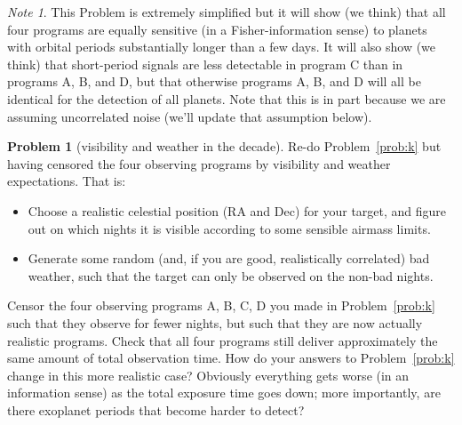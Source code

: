 \documentclass{article}
\theoremstyle{definition}
\newcommand{\problemname}{Problem}
\newtheorem{problem}{\problemname}
\newcommand{\probref}[1]{\problemname~\ref{#1}}
\theoremstyle{remark}
\newcommand{\notename}{Note}
\newtheorem{note}{\notename}[problem]
\begin{document}
\begin{note}
This \problemname{} is extremely simplified but it will show (we think) that all four programs are equally sensitive (in a Fisher-information sense) to planets with orbital periods substantially longer than a few days.
It will also show (we think) that short-period signals are less detectable in program C than in programs A, B, and D,
but that otherwise programs A, B, and D will all be identical for the detection of all planets.
Note that this is in part because we are assuming uncorrelated noise (we'll update that assumption below).
\end{note}

\begin{problem}[visibility and weather in the decade]\label{prob:visibility}
Re-do \probref{prob:k} but having censored the four observing programs by visibility and weather expectations.
That is:
\begin{itemize}
\item
Choose a realistic celestial position (RA and Dec) for your target, and figure out on which nights it is visible according to some sensible airmass limits.
\item
Generate some random (and, if you are good, realistically correlated) bad weather, such that the target can only be observed on the non-bad nights.
\end{itemize}
Censor the four observing programs A, B, C, D you made in \probref{prob:k} such that they observe for fewer nights, but such that they are now actually realistic programs.
Check that all four programs still deliver approximately the same amount of total observation time.
How do your answers to \probref{prob:k} change in this more realistic case?
Obviously everything gets worse (in an information sense) as the total exposure time goes down;
more importantly, are there exoplanet periods that become harder to detect?
\end{problem}
\end{document}

